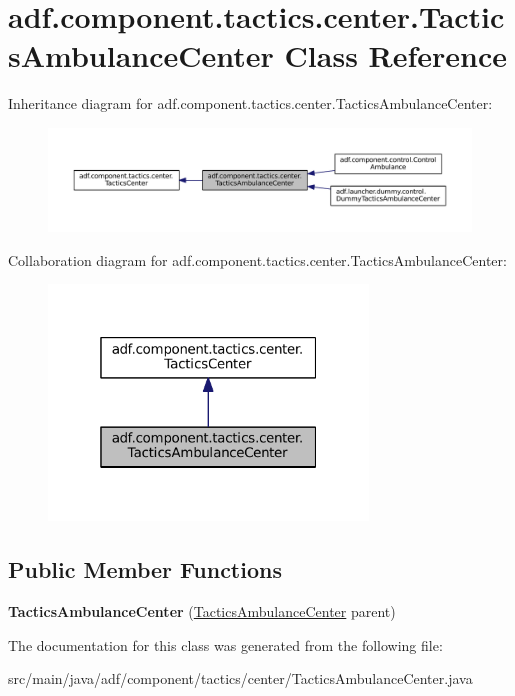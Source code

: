 \hypertarget{classadf_1_1component_1_1tactics_1_1center_1_1TacticsAmbulanceCenter}{}\section{adf.\+component.\+tactics.\+center.\+Tactics\+Ambulance\+Center Class Reference}
\label{classadf_1_1component_1_1tactics_1_1center_1_1TacticsAmbulanceCenter}


Inheritance diagram for adf.\+component.\+tactics.\+center.\+Tactics\+Ambulance\+Center\+:
\nopagebreak
\begin{figure}[H]
\begin{center}
\leavevmode
\includegraphics[width=350pt]{classadf_1_1component_1_1tactics_1_1center_1_1TacticsAmbulanceCenter__inherit__graph}
\end{center}
\end{figure}


Collaboration diagram for adf.\+component.\+tactics.\+center.\+Tactics\+Ambulance\+Center\+:
\nopagebreak
\begin{figure}[H]
\begin{center}
\leavevmode
\includegraphics[width=241pt]{classadf_1_1component_1_1tactics_1_1center_1_1TacticsAmbulanceCenter__coll__graph}
\end{center}
\end{figure}
\subsection*{Public Member Functions}
\begin{DoxyCompactItemize}
\item 
\hypertarget{classadf_1_1component_1_1tactics_1_1center_1_1TacticsAmbulanceCenter_a52180b1fe8eb0a7a649b25cdfc41d18e}{}\label{classadf_1_1component_1_1tactics_1_1center_1_1TacticsAmbulanceCenter_a52180b1fe8eb0a7a649b25cdfc41d18e} 
{\bfseries Tactics\+Ambulance\+Center} (\hyperlink{classadf_1_1component_1_1tactics_1_1center_1_1TacticsAmbulanceCenter}{Tactics\+Ambulance\+Center} parent)
\end{DoxyCompactItemize}


The documentation for this class was generated from the following file\+:\begin{DoxyCompactItemize}
\item 
src/main/java/adf/component/tactics/center/Tactics\+Ambulance\+Center.\+java\end{DoxyCompactItemize}
